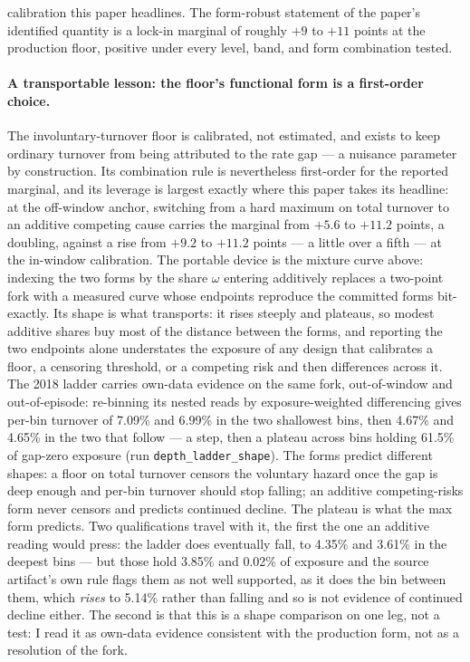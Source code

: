 \documentclass[12pt]{article}
\begin{document}
calibration this paper headlines. The form-robust statement of the paper's identified quantity is a lock-in marginal of roughly $+9$ to $+11$ points at the production floor, positive under every level, band, and form combination tested.

\paragraph{A transportable lesson: the floor's functional form is a first-order choice.} The involuntary-turnover floor is calibrated, not estimated, and exists to keep ordinary turnover from being attributed to the rate gap --- a nuisance parameter by construction. Its combination rule is nevertheless first-order for the reported marginal, and its leverage is largest exactly where this paper takes its headline: at the off-window anchor, switching from a hard maximum on total turnover to an additive competing cause carries the marginal from $+5.6$ to $+11.2$ points, a doubling, against a rise from $+9.2$ to $+11.2$ points --- a little over a fifth --- at the in-window calibration. The portable device is the mixture curve above: indexing the two forms by the share $\omega$ entering additively replaces a two-point fork with a measured curve whose endpoints reproduce the committed forms bit-exactly. Its shape is what transports: it rises steeply and plateaus, so modest additive shares buy most of the distance between the forms, and reporting the two endpoints alone understates the exposure of any design that calibrates a floor, a censoring threshold, or a competing risk and then differences across it. The 2018 ladder carries own-data evidence on the same fork, out-of-window and out-of-episode: re-binning its nested reads by exposure-weighted differencing gives per-bin turnover of 7.09\% and 6.99\% in the two shallowest bins, then 4.67\% and 4.65\% in the two that follow --- a step, then a plateau across bins holding 61.5\% of gap-zero exposure (run \texttt{depth\_ladder\_shape}). The forms predict different shapes: a floor on total turnover censors the voluntary hazard once the gap is deep enough and per-bin turnover should stop falling; an additive competing-risks form never censors and predicts continued decline. The plateau is what the max form predicts. Two qualifications travel with it, the first the one an additive reading would press: the ladder does eventually fall, to 4.35\% and 3.61\% in the deepest bins --- but those hold 3.85\% and 0.02\% of exposure and the source artifact's own rule flags them as not well supported, as it does the bin between them, which \emph{rises} to 5.14\% rather than falling and so is not evidence of continued decline either. The second is that this is a shape comparison on one leg, not a test: I read it as own-data evidence consistent with the production form, not as a resolution of the fork.
\end{document}
